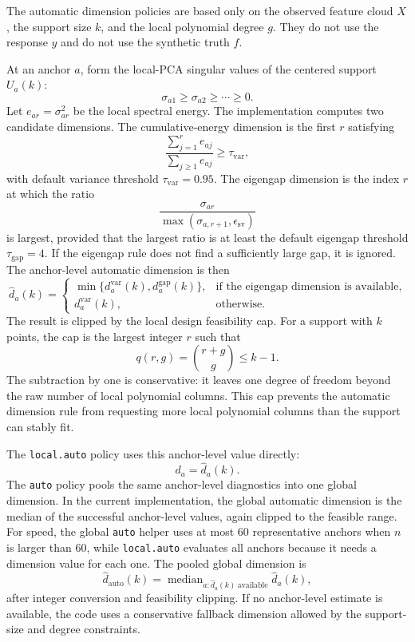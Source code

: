 \documentclass[11pt]{article}
\newcommand{\code}[1]{\texttt{#1}}
\begin{document}
The automatic dimension policies are based only on the observed feature cloud
$X$, the support size $k$, and the local polynomial degree $g$.  They do not use
the response $y$ and do not use the synthetic truth $f$.

At an anchor $a$, form the local-PCA singular values of the centered support
$U_a(k)$:
\[
  \sigma_{a1}\ge \sigma_{a2}\ge\cdots\ge 0.
\]
Let $e_{ar}=\sigma_{ar}^2$ be the local spectral energy.  The implementation
computes two candidate dimensions.  The cumulative-energy dimension is the first
$r$ satisfying
\[
  \frac{\sum_{j=1}^{r} e_{aj}}{\sum_{j\ge 1} e_{aj}}
  \ge \tau_{\mathrm{var}},
\]
with default variance threshold $\tau_{\mathrm{var}}=0.95$.  The eigengap
dimension is the index $r$ at which the ratio
\[
  \frac{\sigma_{ar}}{\max(\sigma_{a,r+1},\epsilon_{\mathrm{sv}})}
\]
is largest, provided that the largest ratio is at least the default eigengap
threshold $\tau_{\mathrm{gap}}=4$.  If the eigengap rule does not find a
sufficiently large gap, it is ignored.  The anchor-level automatic dimension is
then
\[
  \widehat d_a(k)
  =
  \begin{cases}
  \min\{d^{\mathrm{var}}_a(k),d^{\mathrm{gap}}_a(k)\},
    &\text{if the eigengap dimension is available},\\
  d^{\mathrm{var}}_a(k),
    &\text{otherwise}.
  \end{cases}
\]
The result is clipped by the local design feasibility cap.  For a support with
$k$ points, the cap is the largest integer $r$ such that
\[
  q(r,g)=\binom{r+g}{g}\le k-1.
\]
The subtraction by one is conservative: it leaves one degree of freedom beyond
the raw number of local polynomial columns.  This cap prevents the automatic
dimension rule from requesting more local polynomial columns than the support
can stably fit.

The \code{local.auto} policy uses this anchor-level value directly:
\[
  d_a=\widehat d_a(k).
\]
The \code{auto} policy pools the same anchor-level diagnostics into one global
dimension.  In the current implementation, the global automatic dimension is the
median of the successful anchor-level values, again clipped to the feasible
range.  For speed, the global \code{auto} helper uses at most 60 representative
anchors when $n$ is larger than 60, while \code{local.auto} evaluates all
anchors because it needs a dimension value for each one.  The pooled global
dimension is
\[
  \widehat d_{\mathrm{auto}}(k)
  =
  \operatorname{median}_{a:\widehat d_a(k)\ \mathrm{available}}
  \widehat d_a(k),
\]
after integer conversion and feasibility clipping.  If no anchor-level estimate
is available, the code uses a conservative fallback dimension allowed by the
support-size and degree constraints.
\end{document}
